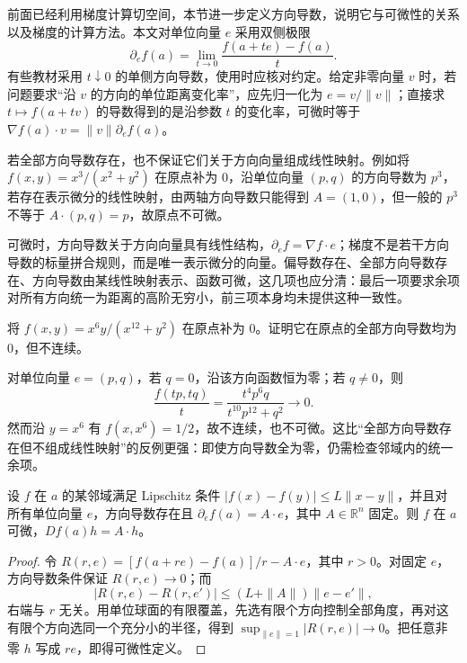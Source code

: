 前面已经利用梯度计算切空间，本节进一步定义方向导数，说明它与可微性的关系以及梯度的计算方法。本文对单位向量 $e$ 采用双侧极限
\[
\partial_ef(a)=\lim_{t\to0}\frac{f(a+te)-f(a)}t.
\]
有些教材采用 $t\downarrow0$ 的单侧方向导数，使用时应核对约定。给定非零向量 $v$ 时，若问题要求“沿 $v$ 的方向的单位距离变化率”，应先归一化为 $e=v/\|v\|$；直接求 $t\mapsto f(a+tv)$ 的导数得到的是沿参数 $t$ 的变化率，可微时等于 $\nabla f(a)\cdot v=\|v\|\partial_ef(a)$。

若全部方向导数存在，也不保证它们关于方向向量组成线性映射。例如将 $f(x,y)=x^3/(x^2+y^2)$ 在原点补为 $0$，沿单位向量 $(p,q)$ 的方向导数为 $p^3$，若存在表示微分的线性映射，由两轴方向导数只能得到 $A=(1,0)$，但一般的 $p^3$ 不等于 $A\cdot(p,q)=p$，故原点不可微。

可微时，方向导数关于方向向量具有线性结构，$\partial_ef=\nabla f\cdot e$；梯度不是若干方向导数的标量拼合规则，而是唯一表示微分的向量。偏导数存在、全部方向导数存在、方向导数由某线性映射表示、函数可微，这几项也应分清：最后一项要求余项对所有方向统一为距离的高阶无穷小，前三项本身均未提供这种一致性。

\begin{example}
\label{ex:pei-zero-directions-discontinuous}
将 $f(x,y)=x^6y/(x^{12}+y^2)$ 在原点补为 $0$。证明它在原点的全部方向导数均为 $0$，但不连续。
\end{example}
\begin{solve}
对单位向量 $e=(p,q)$，若 $q=0$，沿该方向函数恒为零；若 $q\ne0$，则
\[
\frac{f(tp,tq)}t=\frac{t^4p^6q}{t^{10}p^{12}+q^2}\longrightarrow0.
\]
然而沿 $y=x^6$ 有 $f(x,x^6)=1/2$，故不连续，也不可微。这比“全部方向导数存在但不组成线性映射”的反例更强：即使方向导数全为零，仍需检查邻域内的统一余项。
\end{solve}

\begin{theorem}
\label{thm:pei-lipschitz-directional-differentiability}
设 $f$ 在 $a$ 的某邻域满足 Lipschitz 条件 $|f(x)-f(y)|\le L\|x-y\|$，并且对所有单位向量 $e$，方向导数存在且 $\partial_ef(a)=A\cdot e$，其中 $A\in\mathbb R^n$ 固定。则 $f$ 在 $a$ 可微，$Df(a)h=A\cdot h$。
\end{theorem}
\begin{proof}
令 $R(r,e)=[f(a+re)-f(a)]/r-A\cdot e$，其中 $r>0$。对固定 $e$，方向导数条件保证 $R(r,e)\to0$；而
\[
|R(r,e)-R(r,e')|\le(L+\|A\|)\|e-e'\|,
\]
右端与 $r$ 无关。用单位球面的有限覆盖，先选有限个方向控制全部角度，再对这有限个方向选同一个充分小的半径，得到 $\sup_{\|e\|=1}|R(r,e)|\to0$。把任意非零 $h$ 写成 $r e$，即得可微性定义。
\end{proof}

